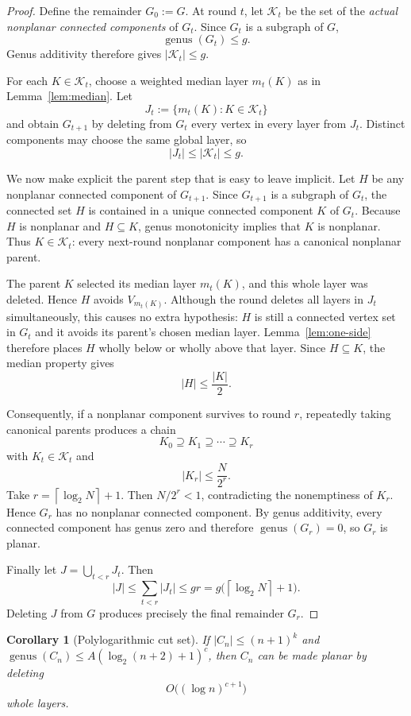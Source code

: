 \documentclass[11pt]{article}
\newtheorem{corollary}[theorem]{Corollary}
\theoremstyle{definition}
\newcommand{\genus}{\operatorname{genus}}
\newcommand{\cK}{\mathcal{K}}
\newcommand{\ceil}[1]{\left\lceil #1\right\rceil}
\begin{document}
\begin{proof}
Define the remainder $G_0:=G$.  At round $t$, let $\cK_t$ be the set of the
\emph{actual nonplanar connected components} of $G_t$.  Since $G_t$ is a
subgraph of $G$,
\[
  \genus(G_t)\le g.
\]
Genus additivity therefore gives $|\cK_t|\le g$.

For each $K\in\cK_t$, choose a weighted median layer $m_t(K)$ as in
Lemma~\ref{lem:median}.  Let
\[
  J_t:=\{m_t(K):K\in\cK_t\}
\]
and obtain $G_{t+1}$ by deleting from $G_t$ every vertex in every layer from
$J_t$.  Distinct components may choose the same global layer, so
\[
  |J_t|\le |\cK_t|\le g.
\]

We now make explicit the parent step that is easy to leave implicit.  Let $H$
be any nonplanar connected component of $G_{t+1}$.  Since $G_{t+1}$ is a
subgraph of $G_t$, the connected set $H$ is contained in a unique connected
component $K$ of $G_t$.  Because $H$ is nonplanar and $H\subseteq K$, genus
monotonicity implies that $K$ is nonplanar.  Thus $K\in\cK_t$: every
next-round nonplanar component has a canonical nonplanar parent.

The parent $K$ selected its median layer $m_t(K)$, and this whole layer was
deleted.  Hence $H$ avoids $V_{m_t(K)}$.  Although the round deletes all
layers in $J_t$ simultaneously, this causes no extra hypothesis: $H$ is still
a connected vertex set in $G_t$ and it avoids its parent's chosen median
layer.  Lemma~\ref{lem:one-side} therefore places $H$ wholly below or wholly
above that layer.  Since $H\subseteq K$, the median property gives
\[
  |H|\le \frac{|K|}{2}.
\]

Consequently, if a nonplanar component survives to round $r$, repeatedly taking
canonical parents produces a chain
\[
  K_0\supseteq K_1\supseteq\cdots\supseteq K_r
\]
with $K_t\in\cK_t$ and
\[
  |K_r|\le \frac{N}{2^r}.
\]
Take $r=\ceil{\log_2 N}+1$.  Then $N/2^r<1$, contradicting the nonemptiness of
$K_r$.  Hence $G_r$ has no nonplanar connected component.  By genus
additivity, every connected component has genus zero and therefore
$\genus(G_r)=0$, so $G_r$ is planar.

Finally let $J=\bigcup_{t<r}J_t$.  Then
\[
  |J|\le \sum_{t<r}|J_t|\le gr
  =g\bigl(\ceil{\log_2 N}+1\bigr).
\]
Deleting $J$ from $G$ produces precisely the final remainder $G_r$.
\end{proof}

\begin{corollary}[Polylogarithmic cut set]\label{cor:cuts}
If $|C_n|\le(n+1)^k$ and
$\genus(C_n)\le A(\log_2(n+2)+1)^c$, then $C_n$ can be made planar by deleting
\[
  O\bigl((\log n)^{c+1}\bigr)
\]
whole layers.
\end{corollary}
\end{document}
